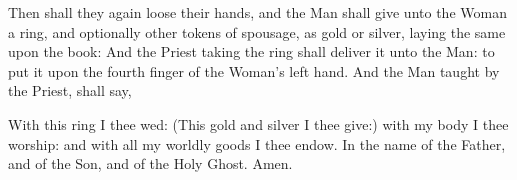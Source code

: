 \clearpage
\begin{rubric}
	Then shall they again loose their hands, and the Man shall give unto the Woman a ring, and 
	optionally other tokens of spousage, as gold or silver, laying the same upon the book: And the Priest taking the ring shall deliver it unto the Man: to put it upon the fourth finger of the Woman's left hand. And the Man taught by the Priest, shall say,
\end{rubric}\par\noindent
With this ring I thee wed: (This gold and silver I thee give:) with my body I thee worship: and with all my worldly goods I thee endow. In the name of the Father, and of the Son, and of the Holy Ghost. Amen.

